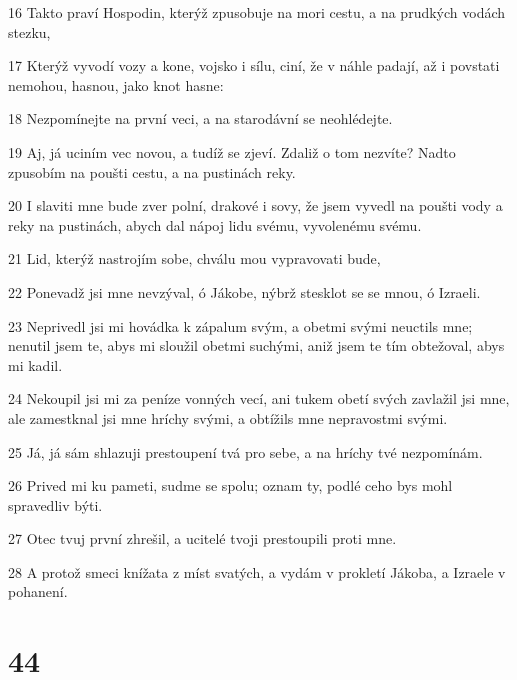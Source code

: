 \par 16 Takto praví Hospodin, kterýž zpusobuje na mori cestu, a na prudkých vodách stezku,
\par 17 Kterýž vyvodí vozy a kone, vojsko i sílu, ciní, že v náhle padají, až i povstati nemohou, hasnou, jako knot hasne:
\par 18 Nezpomínejte na první veci, a na starodávní se neohlédejte.
\par 19 Aj, já uciním vec novou, a tudíž se zjeví. Zdaliž o tom nezvíte? Nadto zpusobím na poušti cestu, a na pustinách reky.
\par 20 I slaviti mne bude zver polní, drakové i sovy, že jsem vyvedl na poušti vody a reky na pustinách, abych dal nápoj lidu svému, vyvolenému svému.
\par 21 Lid, kterýž nastrojím sobe, chválu mou vypravovati bude,
\par 22 Ponevadž jsi mne nevzýval, ó Jákobe, nýbrž stesklot se se mnou, ó Izraeli.
\par 23 Neprivedl jsi mi hovádka k zápalum svým, a obetmi svými neuctils mne; nenutil jsem te, abys mi sloužil obetmi suchými, aniž jsem te tím obtežoval, abys mi kadil.
\par 24 Nekoupil jsi mi za peníze vonných vecí, ani tukem obetí svých zavlažil jsi mne, ale zamestknal jsi mne hríchy svými, a obtížils mne nepravostmi svými.
\par 25 Já, já sám shlazuji prestoupení tvá pro sebe, a na hríchy tvé nezpomínám.
\par 26 Prived mi ku pameti, sudme se spolu; oznam ty, podlé ceho bys mohl spravedliv býti.
\par 27 Otec tvuj první zhrešil, a ucitelé tvoji prestoupili proti mne.
\par 28 A protož smeci knížata z míst svatých, a vydám v prokletí Jákoba, a Izraele v pohanení.

\chapter{44}

